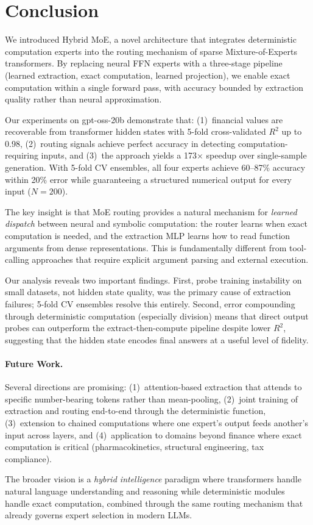 \section{Conclusion}
\label{sec:conclusion}

We introduced Hybrid MoE, a novel architecture that integrates
deterministic computation experts into the routing mechanism of sparse
Mixture-of-Experts transformers. By replacing neural FFN experts with a
three-stage pipeline (learned extraction, exact computation, learned
projection), we enable exact computation within a single forward pass,
with accuracy bounded by extraction quality rather than neural
approximation.

Our experiments on gpt-oss-20b demonstrate that: (1)~financial values
are recoverable from transformer hidden states with 5-fold
cross-validated $R^2$ up to 0.98, (2)~routing signals achieve perfect
accuracy in detecting computation-requiring inputs, and (3)~the
approach yields a 173$\times$ speedup over single-sample generation.
With 5-fold CV ensembles, all four experts achieve 60--87\% accuracy
within 20\% error while guaranteeing a structured numerical output
for every input ($N{=}200$).

The key insight is that MoE routing provides a natural mechanism for
\emph{learned dispatch} between neural and symbolic computation: the
router learns when exact computation is needed, and the extraction MLP
learns how to read function arguments from dense representations. This
is fundamentally different from tool-calling approaches that require
explicit argument parsing and external execution.

Our analysis reveals two important findings. First, probe training
instability on small datasets, not hidden state quality, was
the primary cause of extraction failures; 5-fold CV ensembles resolve
this entirely. Second, error compounding through deterministic
computation (especially division) means that direct output probes can
outperform the extract-then-compute pipeline despite lower $R^2$,
suggesting that the hidden state encodes final answers at a useful
level of fidelity.

\paragraph{Future Work.}
Several directions are promising: (1)~attention-based extraction that
attends to specific number-bearing tokens rather than mean-pooling,
(2)~joint training of extraction and routing end-to-end through the
deterministic function, (3)~extension to chained computations where one
expert's output feeds another's input across layers, and
(4)~application to domains beyond finance where exact computation is
critical (pharmacokinetics, structural engineering, tax compliance).

The broader vision is a \emph{hybrid intelligence} paradigm where
transformers handle natural language understanding and reasoning while
deterministic modules handle exact computation, combined through the
same routing mechanism that already governs expert selection in modern
LLMs.
